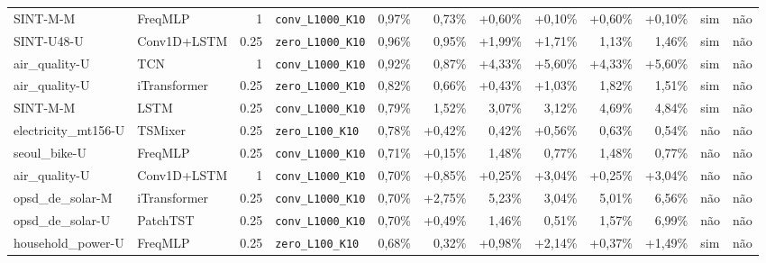 \begin{longtable}{llrlrrrrrrll}
SINT-M-M & FreqMLP & 1 & \texttt{conv\_\allowbreak{}L1000\_\allowbreak{}K10} & \textminus{}0,97\% & \textminus{}0,73\% & +0,60\% & +0,10\% & +0,60\% & +0,10\% & sim & n\~ao \\
SINT-U48-U & Conv1D+LSTM & 0.25 & \texttt{zero\_\allowbreak{}L1000\_\allowbreak{}K10} & \textminus{}0,96\% & \textminus{}0,95\% & +1,99\% & +1,71\% & \textminus{}1,13\% & \textminus{}1,46\% & sim & n\~ao \\
air\_quality-U & TCN & 1 & \texttt{conv\_\allowbreak{}L1000\_\allowbreak{}K10} & \textminus{}0,92\% & \textminus{}0,87\% & +4,33\% & +5,60\% & +4,33\% & +5,60\% & sim & n\~ao \\
air\_quality-U & iTransformer & 0.25 & \texttt{zero\_\allowbreak{}L1000\_\allowbreak{}K10} & \textminus{}0,82\% & \textminus{}0,66\% & +0,43\% & +1,03\% & \textminus{}1,82\% & \textminus{}1,51\% & sim & n\~ao \\
SINT-M-M & LSTM & 0.25 & \texttt{conv\_\allowbreak{}L1000\_\allowbreak{}K10} & \textminus{}0,79\% & \textminus{}1,52\% & \textminus{}3,07\% & \textminus{}3,12\% & \textminus{}4,69\% & \textminus{}4,84\% & sim & n\~ao \\
electricity\_mt156-U & TSMixer & 0.25 & \texttt{zero\_\allowbreak{}L100\_\allowbreak{}K10} & \textminus{}0,78\% & +0,42\% & \textminus{}0,42\% & +0,56\% & \textminus{}0,63\% & \textminus{}0,54\% & n\~ao & n\~ao \\
seoul\_bike-U & FreqMLP & 0.25 & \texttt{conv\_\allowbreak{}L1000\_\allowbreak{}K10} & \textminus{}0,71\% & +0,15\% & \textminus{}1,48\% & \textminus{}0,77\% & \textminus{}1,48\% & \textminus{}0,77\% & n\~ao & n\~ao \\
air\_quality-U & Conv1D+LSTM & 1 & \texttt{conv\_\allowbreak{}L1000\_\allowbreak{}K10} & \textminus{}0,70\% & +0,85\% & +0,25\% & +3,04\% & +0,25\% & +3,04\% & n\~ao & n\~ao \\
opsd\_de\_solar-M & iTransformer & 0.25 & \texttt{conv\_\allowbreak{}L1000\_\allowbreak{}K10} & \textminus{}0,70\% & +2,75\% & \textminus{}5,23\% & \textminus{}3,04\% & \textminus{}5,01\% & \textminus{}6,56\% & n\~ao & n\~ao \\
opsd\_de\_solar-U & PatchTST & 0.25 & \texttt{conv\_\allowbreak{}L1000\_\allowbreak{}K10} & \textminus{}0,70\% & +0,49\% & \textminus{}1,46\% & \textminus{}0,51\% & \textminus{}1,57\% & \textminus{}6,99\% & n\~ao & n\~ao \\
household\_power-U & FreqMLP & 0.25 & \texttt{zero\_\allowbreak{}L100\_\allowbreak{}K10} & \textminus{}0,68\% & \textminus{}0,32\% & +0,98\% & +2,14\% & +0,37\% & +1,49\% & sim & n\~ao \\

\end{longtable}

